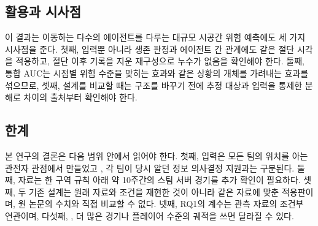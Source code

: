 \subsection{활용과 시사점}
\label{sec:discussion:implications}


이 결과는 이동하는 다수의 에이전트를 다루는 대규모 시공간 위험 예측에도 세 가지 시사점을 준다.
첫째, 입력뿐 아니라 생존 판정과 에이전트 간 관계에도 같은 절단 시각을 적용하고, 절단 이후 기록을 지운 재구성으로 누수가 없음을 확인해야 한다.
둘째, 통합 AUC는 시점별 위험 수준을 맞히는 효과와 같은 상황의 개체를 가려내는 효과를 섞으므로, 
셋째, 설계를 비교할 때는 구조를 바꾸기 전에 추정 대상과 입력을 통제한 분해로 차이의 출처부터 확인해야 한다.

\subsection{한계}
\label{sec:discussion:limitations}

본 연구의 결론은 다음 범위 안에서 읽어야 한다.
첫째, 입력은 모든 팀의 위치를 아는 관전자 관점에서 만들었고 , 각 팀이 당시 알던 정보 의사결정 지원과는 구분된다.
둘째, 자료는 한 구역 규칙 아래 약 10주간의 스팀 서버 경기를  추가 확인이 필요하다.
셋째, 두 기존 설계는 원래 자료와 조건을 재현한 것이 아니라 같은 자료에 맞춘 적용판이며,  원 논문의 수치와 직접 비교할 수 없다.
넷째, RQ1의 계수는 관측 자료의 조건부 연관이며, 
다섯째, , 더 많은 경기나 플레이어 수준의 궤적을 쓰면 달라질 수 있다.

